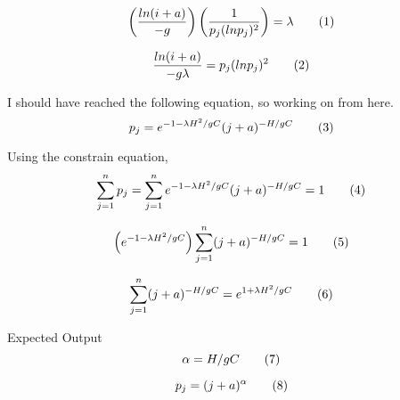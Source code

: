 \[
  \left(
    \frac{ln(i + a)}{-g}
  \right)
  \left(
    \frac{
      1
    }{
      p_j(ln p_j)^2
    }
  \right)
  =
  \lambda
  \addtag
\]

\[
  \frac{ln(i + a)}{-g \lambda}
  =
  p_j(ln p_j)^2
  \addtag
\]

I should have reached the following equation, so working on from here.
\[
  p_j
  =
  e^{
    -1 - 
    \lambda H^2 / gC
  }
  (j + a)^{
    -H / gC
  }
  \addtag
\]

Using the constrain equation,
\[
  \sum_{j=1}^{n}
    p_j
  =
  \sum_{j=1}^{n}
    e^{
      -1 - 
      \lambda H^2 / gC
    }
    (j + a)^{
      -H / gC
    }
  =
  1
  \addtag
\]

\[
  \left(
    e^{
      -1 - 
      \lambda H^2 / gC
    }
  \right)
  \sum_{j=1}^{n}
  (j + a)^{
    -H / gC
  }
  =
  1
  \addtag
\]

\[
  \sum_{j=1}^{n}
  (j + a)^{
    -H / gC
  }
  =
  e^{
    1 + 
    \lambda H^2 / gC
  }
  \addtag
\]

Expected Output
\[
  \alpha = H / gC
  \addtag
\]

\[
  p_j = (j + a)^\alpha
  \addtag
\]
